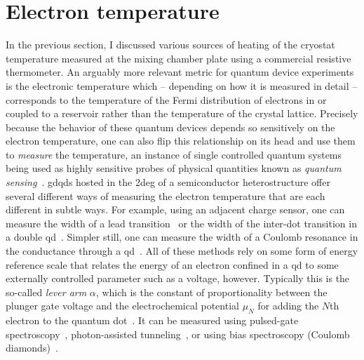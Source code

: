 \section{Electron temperature}\label{sec:setup:cooling:etemp}
In the previous section, I discussed various sources of heating of the cryostat temperature measured at the mixing chamber plate using a commercial resistive thermometer.
An arguably more relevant metric for quantum device experiments is the electronic temperature which -- depending on how it is measured in detail -- corresponds to the temperature of the Fermi distribution of electrons in or coupled to a reservoir rather than the temperature of the crystal lattice.
Precisely because the behavior of these quantum devices depends so sensitively on the electron temperature, one can also flip this relationship on its head and use them to \emph{measure} the temperature, an instance of single controlled quantum systems being used as highly sensitive probes of physical quantities known as \emph{quantum sensing}~\cite{Degen2017}.
\Glspl{gdqd} hosted in the \gls{2deg} of a semiconductor heterostructure offer several different ways of measuring the electron temperature that are each different in subtle ways.
For example, using an adjacent charge sensor, one can measure the width of a lead
transition~\cite{Maradan2014} or the width of the inter-dot transition in a double \gls{qd}~\cite{DiCarlo2004}.
Simpler still, one can measure the width of a Coulomb resonance in the conductance through a \gls{qd}~\cite{Ihn2009,Maradan2014}.
All of these methods rely on some form of energy reference scale that relates the energy of an electron confined in a \gls{qd} to some externally controlled parameter such as a voltage, however.
Typically this is the so-called \emph{lever arm} $\alpha$, which is the constant of proportionality between the plunger gate voltage and the electrochemical potential $\mu_N$ for adding the $N$th electron to the quantum dot~\cite{Ihn2009}.
It can be measured using pulsed-gate spectroscopy~\cite{Fujisawa2001,Harbusch2010}, photon-assisted tunneling~\cite{Kouwenhoven1994}, or using bias spectroscopy (Coulomb diamonds)~\cite{Kouwenhoven2001,Ihn2009}.

